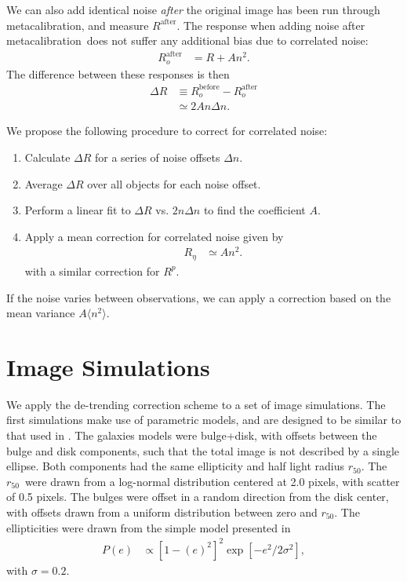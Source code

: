 \documentclass[usegraphicx,usenatbib]{mn2e}
\newcommand{\hlr}{$r_{50}$}
\newcommand{\mcal}{metacalibration}
\newcommand{\mcalRpsf}{$R^{p}$}
\newcommand{\mcalRnoise}{$R_\eta$}
\begin{document}
We can also add identical noise {\em after} the original image  has been run
through \mcal, and measure $R^{\mathrm{after}}$.  The response when adding
noise after \mcal\ does not suffer any additional bias due to correlated noise:
\begin{align}
    R_o^{\mathrm{after}} &= R + A n^2.
\end{align}
The difference between these responses is then 
\begin{align}
    \Delta R &\equiv R_o^{\mathrm{before}} - R_o^{\mathrm{after}}  \nonumber \\
             &\simeq 2 A n \Delta n.
\end{align}

We propose the following procedure to correct for correlated noise:
\begin{enumerate}
    \item Calculate $\Delta R$ for a series of noise offsets $\Delta n$.
    \item Average $\Delta R$ over all objects for each noise offset.
    \item Perform a linear fit to $\Delta R$ vs. $2 n \Delta n$ to find the 
        coefficient $A$.
    \item Apply a mean correction for correlated noise given by
        \begin{align}
            \mbox{\mcalRnoise} & \simeq A n^2.
        \end{align}
        with a similar correction for \mcalRpsf.
\end{enumerate}
If the noise varies between observations, we can apply a 
correction based on the mean variance $A
\langle n^2 \rangle$.


\section{Image Simulations} \label{sec:sims}

We apply the de-trending correction scheme to a set of image simulations.  The
first simulations make use of parametric models, and are designed to be similar
to that used in \citet{bfd2015}.  The galaxies models were bulge+disk, with
offsets between the bulge and disk components, such that the total image
is not described by a single ellipse.  Both
components had the same ellipticity and half light radius \hlr. The \hlr\ were
drawn from a log-normal distribution centered at 2.0 pixels, with scatter of
0.5 pixels.  The bulges were offset in a random direction from the disk center, with
offsets drawn from a uniform distribution between zero and \hlr.  The
ellipticities were drawn from the simple model presented in \cite{ba14}
\begin{align}
    P(e) &\propto \left[1-(e)^2\right]^2 \exp\left[-e^2/2\sigma^2\right],
\end{align}
with $\sigma=0.2$.
\end{document}
